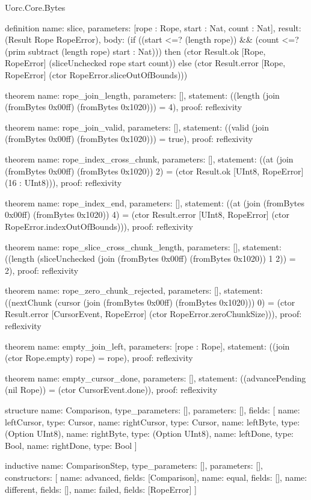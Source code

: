 \begin{lexlean}{Uorc.Core.Bytes}
\begin{semanticmodule}
definition{
  name: slice,
  parameters: [rope : Rope, start : Nat, count : Nat],
  result: (Result Rope RopeError),
  body: (if ((start <=? (length rope)) && (count <=? (prim subtract (length rope) start : Nat))) then (ctor Result.ok [Rope, RopeError] (sliceUnchecked rope start count)) else (ctor Result.error [Rope, RopeError] (ctor RopeError.sliceOutOfBounds)))
}

theorem{
  name: rope_join_length,
  parameters: [],
  statement: ((length (join (fromBytes 0x00ff) (fromBytes 0x1020))) = 4),
  proof: reflexivity{}
}

theorem{
  name: rope_join_valid,
  parameters: [],
  statement: ((valid (join (fromBytes 0x00ff) (fromBytes 0x1020))) = true),
  proof: reflexivity{}
}

theorem{
  name: rope_index_cross_chunk,
  parameters: [],
  statement: ((at (join (fromBytes 0x00ff) (fromBytes 0x1020)) 2) = (ctor Result.ok [UInt8, RopeError] (16 : UInt8))),
  proof: reflexivity{}
}

theorem{
  name: rope_index_end,
  parameters: [],
  statement: ((at (join (fromBytes 0x00ff) (fromBytes 0x1020)) 4) = (ctor Result.error [UInt8, RopeError] (ctor RopeError.indexOutOfBounds))),
  proof: reflexivity{}
}

theorem{
  name: rope_slice_cross_chunk_length,
  parameters: [],
  statement: ((length (sliceUnchecked (join (fromBytes 0x00ff) (fromBytes 0x1020)) 1 2)) = 2),
  proof: reflexivity{}
}

theorem{
  name: rope_zero_chunk_rejected,
  parameters: [],
  statement: ((nextChunk (cursor (join (fromBytes 0x00ff) (fromBytes 0x1020))) 0) = (ctor Result.error [CursorEvent, RopeError] (ctor RopeError.zeroChunkSize))),
  proof: reflexivity{}
}

theorem{
  name: empty_join_left,
  parameters: [rope : Rope],
  statement: ((join (ctor Rope.empty) rope) = rope),
  proof: reflexivity{}
}

theorem{
  name: empty_cursor_done,
  parameters: [],
  statement: ((advancePending (nil Rope)) = (ctor CursorEvent.done)),
  proof: reflexivity{}
}

structure{
  name: Comparison,
  type_parameters: [],
  parameters: [],
  fields: [
    {name: leftCursor, type: Cursor},
    {name: rightCursor, type: Cursor},
    {name: leftByte, type: (Option UInt8)},
    {name: rightByte, type: (Option UInt8)},
    {name: leftDone, type: Bool},
    {name: rightDone, type: Bool}
  ]
}

inductive{
  name: ComparisonStep,
  type_parameters: [],
  parameters: [],
  constructors: [
    {name: advanced, fields: [Comparison]},
    {name: equal, fields: []},
    {name: different, fields: []},
    {name: failed, fields: [RopeError]}
  ]
}


\end{semanticmodule}
\end{lexlean}
